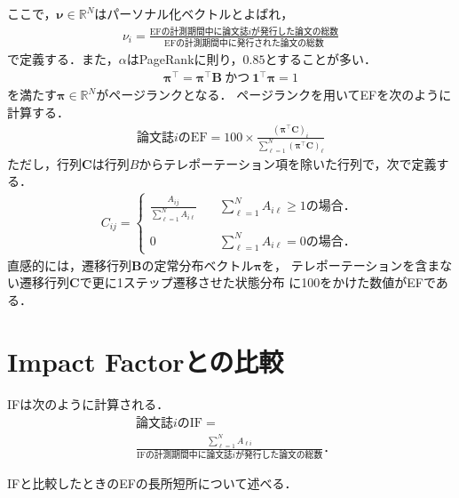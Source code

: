 ここで，$\bm{\nu} \in \mathbb{R}^N$はパーソナル化ベクトルとよばれ，
\begin{align*}
    \nu_i = 
    \frac{\text{EFの計測期間中に論文誌$i$が発行した論文の総数}}{\text{EFの計測期間中に発行された論文の総数}}
\end{align*}
で定義する．また，$\alpha$はPageRankに則り，$0.85$とすることが多い．
\begin{align*}
    \bm{\pi}^{\top} = \bm{\pi}^{\top}\bm{B}~\text{かつ}~ \bm{1}^{\top}\bm{\pi}=1
\end{align*}
を満たす$\bm{\pi} \in \mathbb{R}^N$がページランクとなる．
ページランクを用いてEFを次のように計算する．
\begin{align*}
    \text{論文誌$i$のEF} = 100 \times \frac{( \bm{\pi}^{\top} \bm{C} )_i}{\sum_{\ell=1}^N ( \bm{\pi}^{\top} \bm{C} )_{\ell}}
\end{align*}
ただし，行列$\bm{C}$は行列$B$からテレポーテーション項を除いた行列で，次で定義する\cite{Masuda2013}．
\begin{align*}
    C_{ij} =
    \begin{cases}
        \frac{A_{ij}}{\sum_{\ell=1}^N A_{i\ell}}
        &\quad \sum_{\ell=1}^N A_{i\ell} \geq 1\text{の場合．} \\
        \\
        0
        &\quad \sum_{\ell=1}^N A_{i\ell} =0\text{の場合．} 
    \end{cases}
\end{align*}
直感的には，遷移行列$\bm{B}$の定常分布ベクトル$\bm{\pi}$を，
テレポーテーションを含まない遷移行列$\bm{C}$で更に1ステップ遷移させた状態分布
に100をかけた数値がEFである．


\section{Impact Factorとの比較}
IFは次のように計算される．
\begin{align*}
    & \text{論文誌$i$のIF} = \\
    & \frac{\sum_{\ell=1}^N A_{\ell i}}{\text{IFの計測期間中に論文誌$i$が発行した論文の総数}}．
\end{align*}

IFと比較したときのEFの長所短所について述べる．
